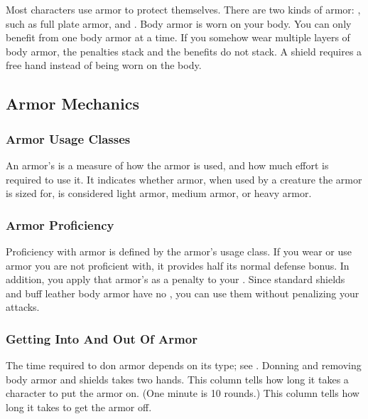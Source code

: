       

\newpage
{}

  Most characters use armor to protect themselves. There are two kinds of armor: , such as full plate armor, and .
  Body armor is worn on your body.
  You can only benefit from one body armor at a time.
  If you somehow wear multiple layers of body armor, the penalties stack and the benefits do not stack.
  A shield requires a free hand instead of being worn on the body.

  \subsection{Armor Mechanics}

    \subsubsection{Armor Usage Classes}\label{Armor Usage Classes}
      An armor's  is a measure of how the armor is used, and how much effort is required to use it.
      It indicates whether armor, when used by a creature the armor is sized for, is considered light armor, medium armor, or heavy armor.

    \subsubsection{Armor Proficiency}\label{Armor Proficiency}
      Proficiency with armor is defined by the armor's usage class.
      If you wear or use armor you are not proficient with, it provides half its normal defense bonus.
      In addition, you apply that armor's  as a penalty to your .
      Since standard shields and buff leather body armor have no , you can use them without penalizing your attacks.

    \subsubsection{Getting Into And Out Of Armor}
      The time required to don armor depends on its type; see . Donning and removing body armor and shields takes two hands.
       This column tells how long it takes a character to put the armor on. (One minute is 10 rounds.)
       This column tells how long it takes to get the armor off.

